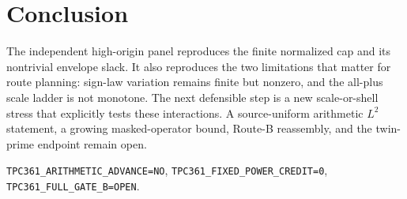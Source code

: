 \documentclass[10pt]{article}
\begin{document}
\section{Conclusion}

The independent high-origin panel reproduces the finite normalized cap and
its nontrivial envelope slack.  It also reproduces the two limitations that
matter for route planning: sign-law variation remains finite but nonzero,
and the all-plus scale ladder is not monotone.  The next defensible step is a
new scale-or-shell stress that explicitly tests these interactions.  A
source-uniform arithmetic $L^2$ statement, a growing masked-operator bound,
Route-B reassembly, and the twin-prime endpoint remain open.

\begin{center}\small
\texttt{TPC361\_ARITHMETIC\_ADVANCE=NO},\quad
\texttt{TPC361\_FIXED\_POWER\_CREDIT=0},\quad
\texttt{TPC361\_FULL\_GATE\_B=OPEN}.
\end{center}
\end{document}
